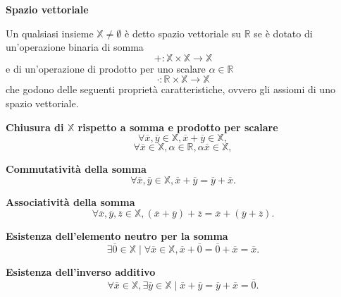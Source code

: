 \begin{definition}\label{def:spazio-vettoriale}
    \textbf{Spazio vettoriale}

    Un qualsiasi insieme $\mathbb{X}\neq\emptyset$  è detto spazio vettoriale su $\mathbb{R}$
    se è dotato di un'operazione binaria di somma 
    \[ +:\mathbb{X}\times\mathbb{X} \rightarrow \mathbb{X} \]
    e di un'operazione di prodotto per uno scalare $\alpha\in\mathbb{R}$ 
    \[ \cdot :\mathbb{R}\times\mathbb{X} \rightarrow \mathbb{X} \]
    che godono delle seguenti proprietà caratteristiche,
    ovvero gli assiomi di uno spazio vettoriale.

    \begin{property}
        \textbf{Chiusura di $\mathbb{X}$ rispetto a somma e prodotto per scalare}
        \[ \forall\overline{x},\overline{y}\in\mathbb{X},
        \overline{x}+\overline{y}\in\mathbb{X}, \]
        \[ \forall\overline{x}\in\mathbb{X},\alpha\in\mathbb{R},
        \alpha\overline{x}\in\mathbb{X}, \]
    \end{property}
    \begin{property}
        \textbf{Commutatività della somma}
        \[ \forall\overline{x},\overline{y}\in\mathbb{X},
        \overline{x}+\overline{y}=\overline{y}+\overline{x}. \]
    \end{property}
    \begin{property}
        \textbf{Associatività della somma}
        \[ \forall\overline{x},\overline{y},\overline{z}\in\mathbb{X},
        \left(\overline{x}+\overline{y}\right)+\overline{z}=
        \overline{x}+\left(\overline{y}+\overline{z}\right). \]
    \end{property}
    \begin{property}
        \textbf{Esistenza dell'elemento neutro per la somma}
        \[ \exists\overline{0}\in\mathbb{X} \mid
        \forall \overline{x}\in\mathbb{X},  \overline{x}+\overline{0}
        =\overline{0}+\overline{x}=\overline{x}.\]
    \end{property}
    \begin{property}
        \textbf{Esistenza dell'inverso additivo}
        \[ \forall \overline{x}\in\mathbb{X},  \exists\overline{y}\in\mathbb{X} \mid
        \overline{x}+\overline{y}=\overline{y}+\overline{x}=\overline{0}.\]
    \end{property}


\end{definition}
